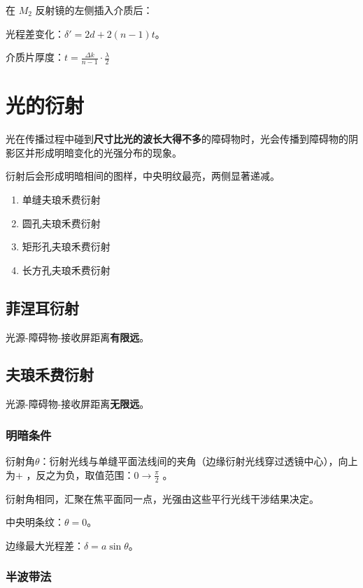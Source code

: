 在 $M_2$ 反射镜的左侧插入介质后：

光程差变化：$\delta{}'=2d+2(n-1)t$。

介质片厚度：$t=\frac{\Delta{k}}{n-1}\cdot\frac{\lambda}{2}$

\section{光的衍射}

光在传播过程中碰到\textbf{尺寸比光的波长大得不多}的障碍物时，光会传播到障碍物的阴影区并形成明暗变化的光强分布的现象。

衍射后会形成明暗相间的图样，中央明纹最亮，两侧显著递减。

\begin{enumerate}
    \item 单缝夫琅禾费衍射
    \item 圆孔夫琅禾费衍射
    \item 矩形孔夫琅禾费衍射
    \item 长方孔夫琅禾费衍射
\end{enumerate}

\subsection{菲涅耳衍射}

光源-障碍物-接收屏距离\textbf{有限远}。

\subsection{夫琅禾费衍射}

光源-障碍物-接收屏距离\textbf{无限远}。

\subsubsection{明暗条件}

衍射角$\theta$：衍射光线与单缝平面法线间的夹角（边缘衍射光线穿过透镜中心），向上为$+$ ，反之为负，取值范围：$0\to\frac{\pi}{2}$ 。

衍射角相同，汇聚在焦平面同一点，光强由这些平行光线干涉结果决定。

中央明条纹：$\theta{}=0$。

边缘最大光程差：$\delta{}=a\sin{\theta}$。

\subsubsection{半波带法}

